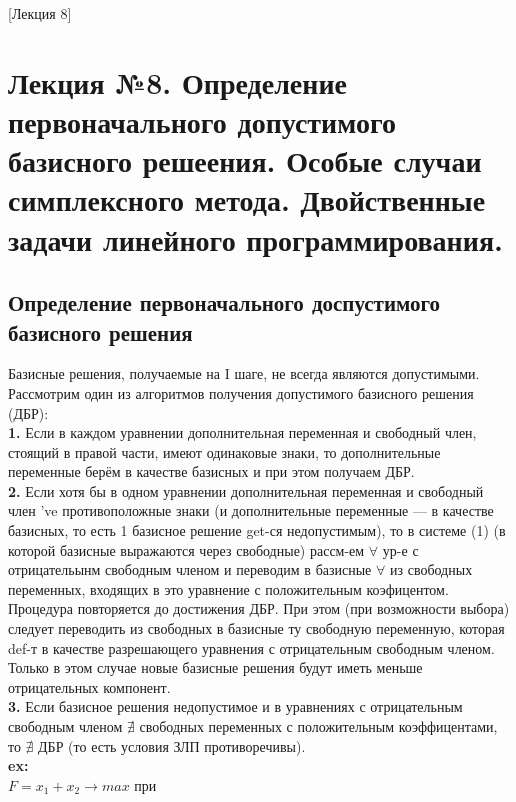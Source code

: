 [Лекция 8]

\newpage

\section{Лекция №8. Определение первоначального допустимого базисного решеения. Особые случаи симплексного метода. Двойственные задачи линейного программирования.}
\subsection{Определение первоначального доспустимого базисного решения}
Базисные решения, получаемые на I шаге, не всегда являются допустимыми.\\
Рассмотрим один из алгоритмов получения допустимого базисного решения (ДБР):\\
\textbf{1.} Если в каждом уравнении дополнительная переменная и свободный член, стоящий в правой части, имеют одинаковые знаки, 
то дополнительные переменные берём в качестве базисных и при этом получаем ДБР.\\
\textbf{2.} Если хотя бы в одном уравнении дополнительная переменная и свободный член 've противоположные знаки (и дополнительные переменные --- в качестве базисных,
то есть 1 базисное решение get-ся недопустимым), то в системе (1) (в которой базисные выражаются через свободные) рассм-ем $\forall$ ур-е с отрицательынм свободным членом и переводим в базисные $\forall$  из свободных переменных, входящих в это уравнение с положительным коэфицентом. \\ 
Процедура повторяется до достижения ДБР.
При этом (при возможности выбора) следует переводить из свободных в базисные ту свободную переменную, которая def-т в качестве разрешающего уравнения с отрицательным свободным членом.
Только в этом случае новые базисные решения будут иметь меньше отрицательных компонент.\\
\textbf{3.} Если базисное решения недопустимое и в уравнениях с отрицательным свободным членом $\nexists$  свободных переменных с положительным коэффицентами, то $\nexists$ ДБР (то есть условия ЗЛП противоречивы). \\
\textbf{ex:}\\ 
$F=x_1+x_2 \rightarrow max$
при 

